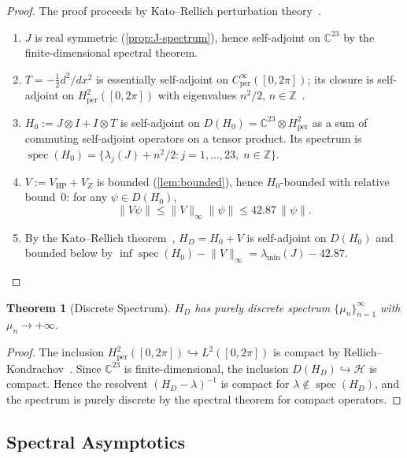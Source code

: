 \documentclass[11pt,a4paper]{article}
\theoremstyle{plain}
\newtheorem{theorem}{Theorem}[section]
\theoremstyle{remark}
\newcommand{\Z}{\mathbb{Z}}
\newcommand{\C}{\mathbb{C}}
\newcommand{\HH}{\mathcal{H}}
\newcommand{\norm}[1]{\lVert #1 \rVert}
\newcommand{\spec}{\operatorname{spec}}
\begin{document}
\begin{proof}
The proof proceeds by Kato--Rellich perturbation theory~\cite{kato1995,reed-simon1978}.
\begin{enumerate}[nosep]
  \item $J$ is real symmetric (\cref{prop:J-spectrum}), hence self-adjoint
        on $\C^{23}$ by the finite-dimensional spectral theorem.
  \item $T=-\tfrac{1}{2}d^2/dx^2$ is essentially self-adjoint on
        $C^\infty_{\mathrm{per}}([0,2\pi])$; its closure is self-adjoint on
        $H^2_{\mathrm{per}}([0,2\pi])$ with eigenvalues $n^2/2$,
        $n\in\Z$~\cite{reed-simon1975}.
  \item $H_0 := J\otimes I + I\otimes T$ is self-adjoint on
        $D(H_0)=\C^{23}\otimes H^2_{\mathrm{per}}$ as a sum of commuting
        self-adjoint operators on a tensor product.  Its spectrum is
        $\spec(H_0)=\{\lambda_j(J)+n^2/2 : j=1,\ldots,23,\; n\in\Z\}$.
  \item $V := V_{\mathrm{HP}}+V_Z$ is bounded (\cref{lem:bounded}), hence
        $H_0$-bounded with relative bound~$0$: for any $\psi\in D(H_0)$,
        \[
          \norm{V\psi} \leq \norm{V}_\infty\norm{\psi}
          \leq 42.87\,\norm{\psi}.
        \]
  \item By the Kato--Rellich theorem~\cite{kato1995}, $H_D = H_0 + V$ is
        self-adjoint on $D(H_0)$ and bounded below by
        $\inf\spec(H_0)-\norm{V}_\infty
        = \lambda_{\min}(J)-42.87$.
        \qedhere
\end{enumerate}
\end{proof}

\begin{theorem}[Discrete Spectrum]\label{thm:discrete}
$H_D$ has purely discrete spectrum $\{\mu_n\}_{n=1}^\infty$ with
$\mu_n\to+\infty$.
\end{theorem}

\begin{proof}
The inclusion $H^2_{\mathrm{per}}([0,2\pi])\hookrightarrow L^2([0,2\pi])$
is compact by Rellich--Kondrachov~\cite{adams-fournier2003}.  Since
$\C^{23}$ is finite-dimensional, the inclusion
$D(H_D)\hookrightarrow\HH$ is compact.  Hence the resolvent
$(H_D-\lambda)^{-1}$ is compact for $\lambda\notin\spec(H_D)$,
and the spectrum is purely discrete by the spectral theorem for
compact operators.
\end{proof}

\subsection{Spectral Asymptotics}
\label{sec:weyl}
\end{document}
